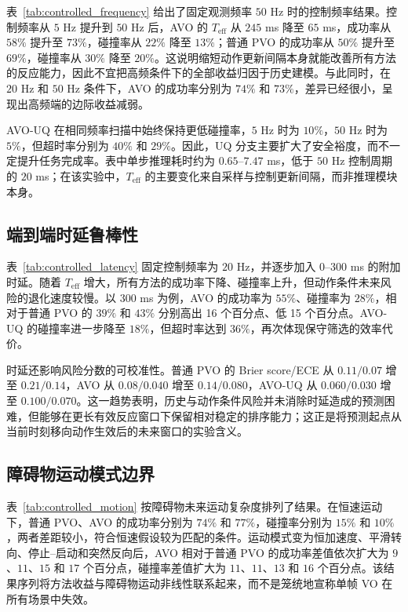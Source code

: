 \documentclass[UTF8,10pt,a4paper,twocolumn]{ctexart}
\begin{document}
表~\ref{tab:controlled_frequency} 给出了固定观测频率 $50$ Hz 时的控制频率结果。控制频率从 $5$ Hz 提升到 $50$ Hz 后，AVO 的 $T_{\mathrm{eff}}$ 从 $245$ ms 降至 $65$ ms，成功率从 $58\%$ 提升至 $73\%$，碰撞率从 $22\%$ 降至 $13\%$；普通 PVO 的成功率从 $50\%$ 提升至 $69\%$，碰撞率从 $30\%$ 降至 $20\%$。这说明缩短动作更新间隔本身就能改善所有方法的反应能力，因此不宜把高频条件下的全部收益归因于历史建模。与此同时，在 $20$ Hz 和 $50$ Hz 条件下，AVO 的成功率分别为 $74\%$ 和 $73\%$，差异已经很小，呈现出高频端的边际收益减弱。

AVO-UQ 在相同频率扫描中始终保持更低碰撞率，$5$ Hz 时为 $10\%$，$50$ Hz 时为 $5\%$，但超时率分别为 $40\%$ 和 $29\%$。因此，UQ 分支主要扩大了安全裕度，而不一定提升任务完成率。表中单步推理耗时约为 $0.65$--$7.47$ ms，低于 $50$ Hz 控制周期的 $20$ ms；在该实验中，$T_{\mathrm{eff}}$ 的主要变化来自采样与控制更新间隔，而非推理模块本身。

\subsection{端到端时延鲁棒性}

表~\ref{tab:controlled_latency} 固定控制频率为 $20$ Hz，并逐步加入 $0$--$300$ ms 的附加时延。随着 $T_{\mathrm{eff}}$ 增大，所有方法的成功率下降、碰撞率上升，但动作条件未来风险的退化速度较慢。以 $300$ ms 为例，AVO 的成功率为 $55\%$、碰撞率为 $28\%$，相对于普通 PVO 的 $39\%$ 和 $43\%$ 分别高出 16 个百分点、低 15 个百分点。AVO-UQ 的碰撞率进一步降至 $18\%$，但超时率达到 $36\%$，再次体现保守筛选的效率代价。

时延还影响风险分数的可校准性。普通 PVO 的 Brier score/ECE 从 $0.11/0.07$ 增至 $0.21/0.14$，AVO 从 $0.08/0.040$ 增至 $0.14/0.080$，AVO-UQ 从 $0.060/0.030$ 增至 $0.100/0.070$。这一趋势表明，历史与动作条件风险并未消除时延造成的预测困难，但能够在更长有效反应窗口下保留相对稳定的排序能力；这正是将预测起点从当前时刻移向动作生效后的未来窗口的实验含义。

\subsection{障碍物运动模式边界}

表~\ref{tab:controlled_motion} 按障碍物未来运动复杂度排列了结果。在恒速运动下，普通 PVO、AVO 的成功率分别为 $74\%$ 和 $77\%$，碰撞率分别为 $15\%$ 和 $10\%$，两者差距较小，符合恒速假设较为匹配的条件。运动模式变为恒加速度、平滑转向、停止--启动和突然反向后，AVO 相对于普通 PVO 的成功率差值依次扩大为 $9$、$11$、$15$ 和 $17$ 个百分点，碰撞率差值扩大为 $11$、$11$、$13$ 和 $16$ 个百分点。该结果序列将方法收益与障碍物运动非线性联系起来，而不是笼统地宣称单帧 VO 在所有场景中失效。
\end{document}
